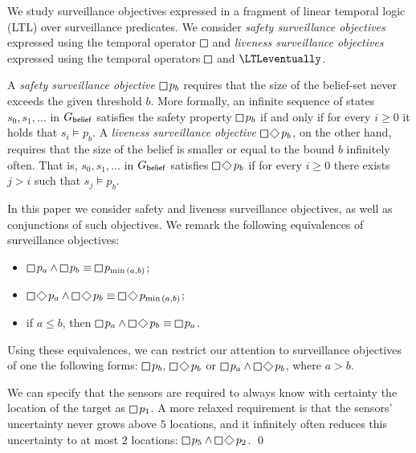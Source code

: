 We study surveillance objectives expressed in a fragment  of linear temporal logic (LTL) over surveillance predicates.  We consider  \emph{safety surveillance objectives} expressed using the temporal operator $\LTLglobally$ and \emph{liveness surveillance objectives} expressed using the temporal operators $\LTLglobally$ and $\LTLeventually$.

A \emph{safety surveillance objective} $\LTLglobally p_b$ requires that the size of the belief-set never exceeds the given threshold $b$. More formally, an infinite sequence of states $s_0,s_1,\ldots$ in $G_{\mathsf{belief}}$ satisfies the safety property $\LTLglobally p_b$ if and only if for every $i\geq 0$ it holds that $s_i \models p_b$.  A \emph{liveness surveillance objective} $\LTLglobally\LTLfinally p_b$, on the other hand, requires that 
the size of the belief is smaller or equal to the bound $b$  infinitely often. That is, $s_0,s_1,\ldots$ in $G_{\mathsf{belief}}$ satisfies $\LTLglobally\LTLfinally p_b$ if for every $i \geq 0$ there exists $j >i$ such that $s_j\models p_b$. 

In this paper we consider safety and liveness surveillance objectives, as well as conjunctions of such objectives. We remark the following equivalences of surveillance objectives:
\begin{itemize}
\item $\LTLglobally p_a \wedge \LTLglobally p_b \equiv \LTLglobally p_{\min{(a,b)}}$;
\item $\LTLglobally\LTLfinally p_a \wedge \LTLglobally\LTLfinally p_b \equiv \LTLglobally\LTLfinally p_{\min{(a,b)}}$;
\item if $a \leq b$, then $\LTLglobally p_a \wedge \LTLglobally\LTLfinally p_b \equiv\LTLglobally p_a$. 
\end{itemize}
Using these equivalences, we can restrict our attention to surveillance objectives of one the following  forms: $\LTLglobally p_b$, $\LTLglobally\LTLfinally p_b$ or $\LTLglobally p_a \wedge \LTLglobally\LTLfinally p_b$, where $a > b$. 
 


\begin{example}
We can specify that the sensors are required to always know with certainty the location of the target as
$\LTLglobally p_1$.
A more relaxed requirement is that the sensors' uncertainty never grows above $5$ locations, and it infinitely often reduces this uncertainty to at most $2$ locations: $\LTLglobally p_5 \wedge \LTLglobally\LTLfinally p_2$.
\qed
\end{example}



